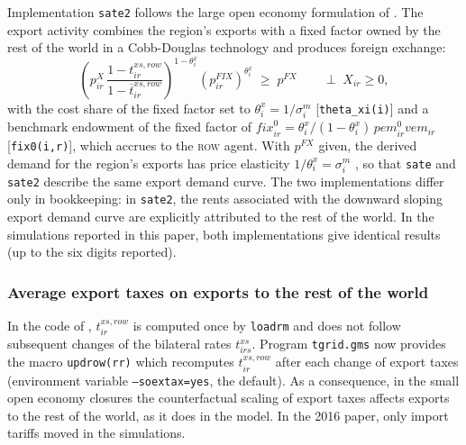 Implementation \texttt{sate2} follows the large open economy formulation of \citet{Schreiber2024}.
The export activity combines the region's exports with a fixed factor owned by the rest of the world in a Cobb-Douglas technology and produces foreign exchange:
\begin{equation}\label{zpXsate2}
\left(p^X_{ir}\,\frac{1-t^{xs,row}_{ir}}{1-\overline{t}^{xs,row}_{ir}}\right)^{1-\theta^{x}_{i}}
\left(p^{FIX}_{ir}\right)^{\theta^{x}_{i}} \;\geq\; p^{FX}
\qquad \perp \; X_{ir}\geq 0,
\end{equation}
with the cost share of the fixed factor set to $\theta^x_i=1/\sigma^m_i$ [\texttt{theta\_xi(i)}] and a benchmark endowment of the fixed factor of $\textit{fix}^0_{ir}=\theta^x_i/(1-\theta^x_i)\,\textit{pem}^0_{ir}\textit{vem}_{ir}$ [\texttt{fix0(i,r)}], which accrues to the \textsc{row} agent.
With $p^{FX}$ given, the derived demand for the region's exports has price elasticity $1/\theta^x_i=\sigma^m_i$ \citep[Proposition 2]{Schreiber2024}, so that \texttt{sate} and \texttt{sate2} describe the same export demand curve.
The two implementations differ only in bookkeeping: in \texttt{sate2}, the rents associated with the downward sloping export demand curve are explicitly attributed to the rest of the world.
In the simulations reported in this paper, both implementations give identical results (up to the six digits reported).

\subsubsection{Average export taxes on exports to the rest of the world}

In the code of \citet{LanzRutherford2016}, $t^{xs,row}_{ir}$ is computed once by \texttt{loadrm} and does not follow subsequent changes of the bilateral rates $t^{xs}_{irs}$.
Program \texttt{tgrid.gms} now provides the macro \texttt{updrow(rr)} which recomputes $t^{xs,row}_{ir}$ after each change of export taxes (environment variable \texttt{--soextax=yes}, the default).
As a consequence, in the small open economy closures the counterfactual scaling of export taxes affects exports to the rest of the world, as it does in the \GMR model.
In the 2016 paper, only import tariffs moved in the \SOE simulations.
